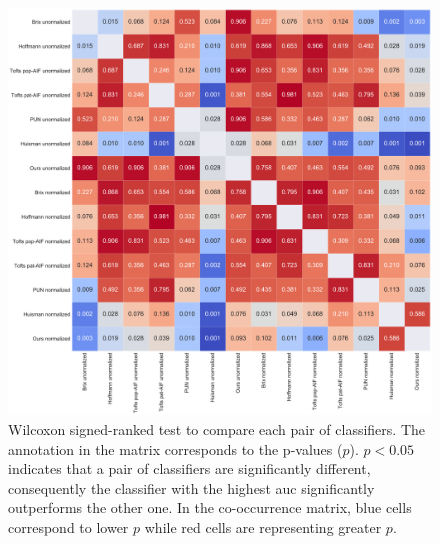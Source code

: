 \begin{figure}
  \centering
  \includegraphics[width=1.\linewidth]{03_experiments/figures/wilcoxon.pdf}
  \caption{Wilcoxon signed-ranked test to compare each pair of
    classifiers. The annotation in the matrix corresponds to the
    p-values ($p$). $p < 0.05$ indicates that a pair of classifiers
    are significantly different, consequently the classifier with the
    highest \acs*{auc} significantly outperforms the other
    one. In the co-occurrence matrix, {\color{blue}blue} cells
    correspond to lower $p$ while {\color{red} red} cells are
    representing greater $p$.}
  \label{fig:wilcoxon}
\end{figure}

